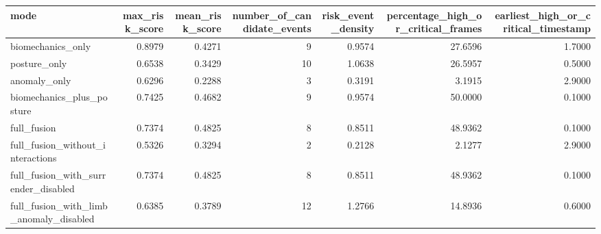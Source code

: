 \begin{tabular}{lrrrrrr}
\toprule
mode & max\_risk\_score & mean\_risk\_score & number\_of\_candidate\_events & risk\_event\_density & percentage\_high\_or\_critical\_frames & earliest\_high\_or\_critical\_timestamp \\
\midrule
biomechanics\_only & 0.8979 & 0.4271 & 9 & 0.9574 & 27.6596 & 1.7000 \\
posture\_only & 0.6538 & 0.3429 & 10 & 1.0638 & 26.5957 & 0.5000 \\
anomaly\_only & 0.6296 & 0.2288 & 3 & 0.3191 & 3.1915 & 2.9000 \\
biomechanics\_plus\_posture & 0.7425 & 0.4682 & 9 & 0.9574 & 50.0000 & 0.1000 \\
full\_fusion & 0.7374 & 0.4825 & 8 & 0.8511 & 48.9362 & 0.1000 \\
full\_fusion\_without\_interactions & 0.5326 & 0.3294 & 2 & 0.2128 & 2.1277 & 2.9000 \\
full\_fusion\_with\_surrender\_disabled & 0.7374 & 0.4825 & 8 & 0.8511 & 48.9362 & 0.1000 \\
full\_fusion\_with\_limb\_anomaly\_disabled & 0.6385 & 0.3789 & 12 & 1.2766 & 14.8936 & 0.6000 \\
\bottomrule
\end{tabular}
